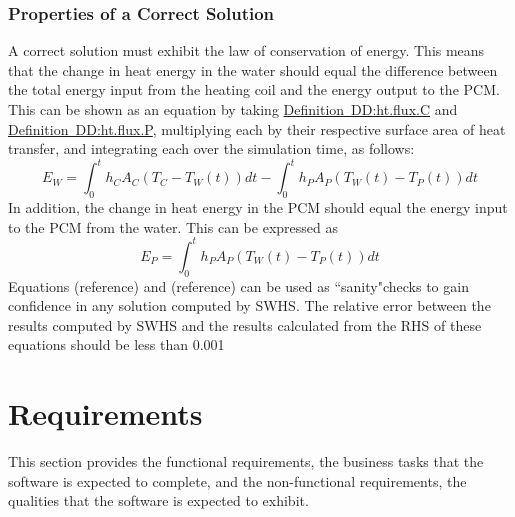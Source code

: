 \documentclass[12pt]{article}
\begin{document}
\subsubsection{Properties of a Correct Solution}
\label{Sec:PropofACorrSolu}
A correct solution must exhibit the law of conservation of energy. This means that the change in heat energy in the water should equal the difference between the total energy input from the heating coil and the energy output to the PCM. This can be shown as an equation by taking \hyperref[DD:ht.flux.C]{Definition~DD:ht.flux.C} and \hyperref[DD:ht.flux.P]{Definition~DD:ht.flux.P}, multiplying each by their respective surface area of heat transfer, and integrating each over the simulation time, as follows:
\begin{equation}
E_{W}=\int_{0}^{t}{h_{C}A_{C}(T_{C}-T_{W}(t))dt}-\int_{0}^{t}{h_{P}A_{P}(T_{W}(t)-T_{P}(t))dt}
\end{equation}
In addition, the change in heat energy in the PCM should equal the energy input to the PCM from the water. This can be expressed as
\begin{equation}
E_{P}=\int_{0}^{t}{h_{P}A_{P}(T_{W}(t)-T_{P}(t))dt}
\end{equation}
Equations (reference) and (reference) can be used as ``sanity"checks to gain confidence in any solution computed by SWHS. The relative error between the results computed by SWHS and the results calculated from the RHS of these equations should be less than 0.001%
\section{Requirements}
\label{Sec:Requ}
This section provides the functional requirements, the business tasks that the software is expected to complete, and the non-functional requirements, the qualities that the software is expected to exhibit.
\end{document}
